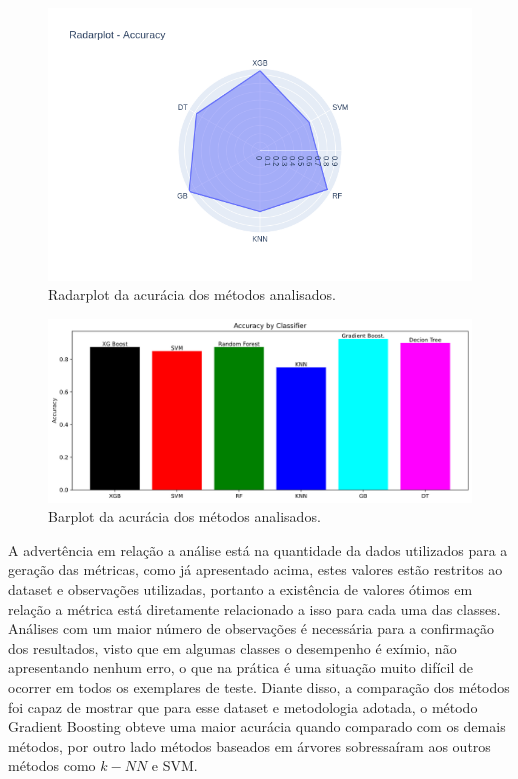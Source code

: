 \documentclass[
	article,			%
	11pt,				%
	oneside,			%
	a4paper,			%
	english,			%
	brazil,				%
	sumario=tradicional
	]{abntex2}
\begin{document}
\begin{figure}[H]
 \centering
 \includegraphics[scale=0.5]{fig/radarplot.png}
 \caption{Radarplot da acurácia dos métodos analisados.}
 \label{fig:radar}
\end{figure}

\begin{figure}[H]
 \centering
 \includegraphics[scale=0.4]{fig/barplot.png}
 \caption{Barplot da acurácia dos métodos analisados.}
 \label{fig:barplot}
\end{figure}

A advertência em relação a análise está na quantidade da dados utilizados para a geração das métricas, como já apresentado acima, estes valores estão restritos ao dataset e observações utilizadas, portanto a existência de valores ótimos em relação a métrica está diretamente relacionado a isso para cada uma das classes. Análises com um maior número de observações é necessária para a confirmação dos resultados, visto que em algumas classes o desempenho é exímio, não apresentando nenhum erro, o que na prática é uma situação muito difícil de ocorrer em todos os exemplares de teste. Diante disso, a comparação dos métodos foi capaz de mostrar que para esse dataset e metodologia adotada, o método Gradient Boosting obteve uma maior acurácia quando comparado com os demais métodos, por outro lado métodos baseados em árvores sobressaíram aos outros métodos como $k-NN$ e SVM. 
\end{document}
